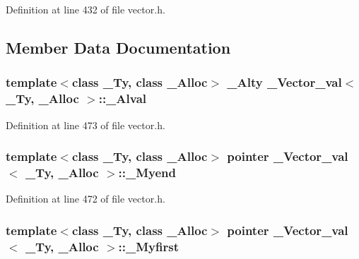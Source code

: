Definition at line 432 of file vector.\+h.



\subsection{Member Data Documentation}
\hypertarget{class___vector__val_a86df8093d4b6a58caa7e8d7ff0c441fd}{
\subsubsection[{\+\_\+\+Alval}]{\setlength{\rightskip}{0pt plus 5cm}template$<$class \+\_\+\+Ty, class \+\_\+\+Alloc$>$ {\bf \+\_\+\+Alty} {\bf \+\_\+\+Vector\+\_\+val}$<$ \+\_\+\+Ty, \+\_\+\+Alloc $>$\+::\+\_\+\+Alval}}\label{class___vector__val_a86df8093d4b6a58caa7e8d7ff0c441fd}


Definition at line 473 of file vector.\+h.

\hypertarget{class___vector__val_a6ae5d0e49562c6cc6b697450284cda58}{
\subsubsection[{\+\_\+\+Myend}]{\setlength{\rightskip}{0pt plus 5cm}template$<$class \+\_\+\+Ty, class \+\_\+\+Alloc$>$ {\bf pointer} {\bf \+\_\+\+Vector\+\_\+val}$<$ \+\_\+\+Ty, \+\_\+\+Alloc $>$\+::\+\_\+\+Myend}}\label{class___vector__val_a6ae5d0e49562c6cc6b697450284cda58}


Definition at line 472 of file vector.\+h.

\hypertarget{class___vector__val_ac10d5b268d1c2c005f2b9257e5458ec7}{
\subsubsection[{\+\_\+\+Myfirst}]{\setlength{\rightskip}{0pt plus 5cm}template$<$class \+\_\+\+Ty, class \+\_\+\+Alloc$>$ {\bf pointer} {\bf \+\_\+\+Vector\+\_\+val}$<$ \+\_\+\+Ty, \+\_\+\+Alloc $>$\+::\+\_\+\+Myfirst}}\label{class___vector__val_ac10d5b268d1c2c005f2b9257e5458ec7}


